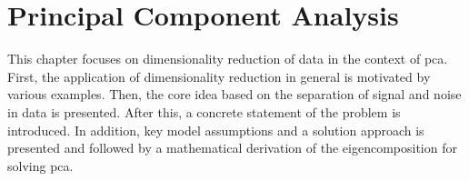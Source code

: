 \documentclass[../../../main.tex]{subfiles}
\begin{document}
\section{Principal Component Analysis}
This chapter focuses on dimensionality reduction of data in the context of \gls{pca}. First, the application of dimensionality reduction in general is motivated by various examples. Then, the core idea based on the separation of signal and noise in data is presented. After this, a concrete statement of the problem is introduced. In addition, key model assumptions and a solution approach is presented and followed by a mathematical derivation of the eigencomposition for solving \gls{pca}.






\end{document}
